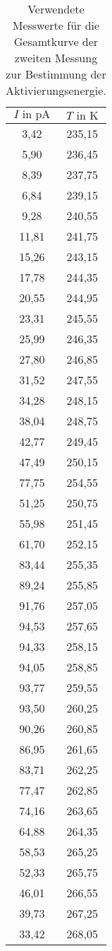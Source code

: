 \begin{longtable}{c c}
\caption{Verwendete Messwerte für die Gesamtkurve der zweiten Messung zur Bestimmung der Aktivierungsenergie.}
\label{tab:lnlinfit2}\\
\hline
$I \text{ in } \si{\pico\ampere}$ & $ T \text{ in } \si{\kelvin} $ \\
\hline
\endhead
3,42 & 235,15\\
5,90 & 236,45\\
8,39 & 237,75\\
6,84 & 239,15\\
9,28 & 240,55\\
11,81 & 241,75\\
15,26 & 243,15\\
17,78 & 244,35\\
20,55 & 244,95\\
23,31 & 245,55\\
25,99 & 246,35\\
27,80 & 246,85\\
31,52 & 247,55\\
34,28 & 248,15\\
38,04 & 248,75\\
42,77 & 249,45\\
47,49 & 250,15\\
77,75 & 254,55\\
51,25 & 250,75\\
55,98 & 251,45\\
61,70 & 252,15\\
83,44 & 255,35\\
89,24 & 255,85\\
91,76 & 257,05\\
94,53 & 257,65\\
94,33 & 258,15\\
94,05 & 258,85\\
93,77 & 259,55\\
93,50 & 260,25\\
90,26 & 260,85\\
86,95 & 261,65\\
83,71 & 262,25\\
77,47 & 262,85\\
74,16 & 263,65\\
64,88 & 264,35\\
58,53 & 265,25\\
52,33 & 265,75\\
46,01 & 266,55\\
39,73 & 267,25\\
33,42 & 268,05\\

\end{longtable}
